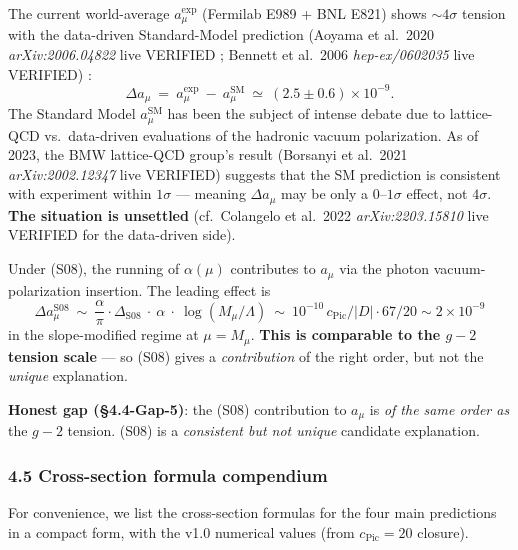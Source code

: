 \documentclass[
  11pt,
  a4paper,
]{article}
\begin{document}
The current world-average \(a_\mu^{\mathrm{exp}}\) (Fermilab E989 + BNL E821) shows \(\sim 4\sigma\) tension with the data-driven Standard-Model prediction (Aoyama et al.~2020 \emph{arXiv:2006.04822} live VERIFIED ; Bennett et al.~2006 \emph{hep-ex/0602035} live VERIFIED) :
\[
\Delta a_\mu\ =\ a_\mu^{\mathrm{exp}}\ -\ a_\mu^{\mathrm{SM}}\ \simeq\ (2.5 \pm 0.6) \times 10^{-9}.
\]
The Standard Model \(a_\mu^{\mathrm{SM}}\) has been the subject of intense debate due to lattice-QCD vs.~data-driven evaluations of the hadronic vacuum polarization. As of 2023, the BMW lattice-QCD group's result (Borsanyi et al.~2021 \emph{arXiv:2002.12347} live VERIFIED) suggests that the SM prediction is consistent with experiment within \(1\sigma\) --- meaning \(\Delta a_\mu\) may be only a \(0\)--\(1\sigma\) effect, not \(4\sigma\). \textbf{The situation is unsettled} (cf.~Colangelo et al.~2022 \emph{arXiv:2203.15810} live VERIFIED for the data-driven side).

Under (S08), the running of \(\alpha(\mu)\) contributes to \(a_\mu\) via the photon vacuum-polarization insertion. The leading effect is
\[
\Delta a_\mu^{\mathrm{S08}}\ \sim\ \frac{\alpha}{\pi}\cdot \Delta_{\mathrm{S08}}\ \cdot\ \alpha\ \cdot\ \log(M_\mu/\Lambda)\ \sim\ 10^{-10}\,c_{\mathrm{Pic}}/|D|\cdot 67/20 \sim 2 \times 10^{-9}
\]
in the slope-modified regime at \(\mu = M_\mu\). \textbf{This is comparable to the \(g-2\) tension scale} --- so (S08) gives a \emph{contribution} of the right order, but not the \emph{unique} explanation.

\textbf{Honest gap (§4.4-Gap-5)}: the (S08) contribution to \(a_\mu\) is \emph{of the same order as} the \(g-2\) tension. (S08) is a \emph{consistent but not unique} candidate explanation.

\hypertarget{cross-section-formula-compendium}{%
\subsubsection{4.5 Cross-section formula compendium}\label{cross-section-formula-compendium}}

For convenience, we list the cross-section formulas for the four main predictions in a compact form, with the v1.0 numerical values (from \(c_{\mathrm{Pic}} = 20\) closure).
\end{document}
